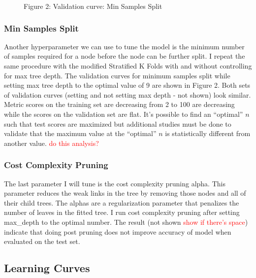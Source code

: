 \documentclass{article}
\newcommand\todo[1]{\textcolor{red}{#1}}
\begin{document}
\begin{figure}
	\centering
	Figure 2: Validation curve: Min Samples Split
\end{figure}

\subsubsection*{Min Samples Split}
Another hyperparameter we can use to tune the model is the minimum number of samples required for a node before the node can be further split. I repeat the same procedure with the modified Stratified K Folds with and without controlling for max tree depth. The validation curves for minimum samples split while setting max tree depth to the optimal value of 9 are shown in Figure 2. Both sets of validation curves (setting and not setting max depth - not shown) look similar. Metric scores on the training set are decreasing from 2 to 100 are decreasing while the scores on the validation set are flat. It's possible to find an ``optimal'' $n$ such that test scores are maximized but additional studies must be done to validate that the maximum value at the ``optimal'' $n$ is statistically different from another value. \todo{do this analysis?}

\subsubsection*{Cost Complexity Pruning}
The last parameter I will tune is the cost complexity pruning alpha. This parameter reduces the weak links in the tree by removing those nodes and all of their child trees. The alphas are a regularization parameter that penalizes the number of leaves in the fitted tree. I run cost complexity pruning after setting max\_depth to the optimal number. The result (not shown \todo{show if there's space}) indicate that doing post pruning does not improve accuracy of model when evaluated on the test set. 

\subsection*{Learning Curves}
\end{document}

